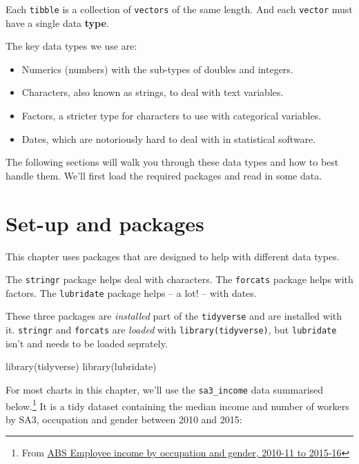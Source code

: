 \documentclass[
]{book}
\newenvironment{Shaded}{\begin{snugshade}}{\end{snugshade}}
\newcommand{\FunctionTok}[1]{\textcolor[rgb]{0.00,0.00,0.00}{#1}}
\newcommand{\NormalTok}[1]{#1}
\providecommand{\tightlist}{%
  \setlength{\itemsep}{0pt}\setlength{\parskip}{0pt}}
\begin{document}
Each \texttt{tibble} is a collection of \texttt{vectors} of the same length. And each \texttt{vector} must have a single data \textbf{type}.

The key data types we use are:

\begin{itemize}
\tightlist
\item
  Numerics (numbers) with the sub-types of doubles and integers.
\item
  Characters, also known as strings, to deal with text variables.
\item
  Factors, a stricter type for characters to use with categorical variables.
\item
  Dates, which are notoriously hard to deal with in statistical software.
\end{itemize}

The following sections will walk you through these data types and how to best handle them. We'll first load the required packages and read in some data.

\hypertarget{set-up-and-packages}{%
\section{Set-up and packages}\label{set-up-and-packages}}

This chapter uses packages that are designed to help with different data types.

The \texttt{stringr} package helps deal with characters. The \texttt{forcats} package helps with factors. The \texttt{lubridate} package helps -- a lot! -- with dates.

These three packages are \emph{installed} part of the \texttt{tidyverse} and are installed with it. \texttt{stringr} and \texttt{forcats} are \emph{loaded} with \texttt{library(tidyverse)}, but \texttt{lubridate} isn't and needs to be loaded seprately.

\begin{Shaded}
\begin{Highlighting}[]
\FunctionTok{library}\NormalTok{(tidyverse)}
\FunctionTok{library}\NormalTok{(lubridate)}
\end{Highlighting}
\end{Shaded}

For most charts in this chapter, we'll use the \texttt{sa3\_income} data summarised below.\footnote{From \href{https://www.abs.gov.au/AUSSTATS/abs@.nsf/DetailsPage/6524.0.55.0022011-2016?OpenDocument}{ABS Employee income by occupation and gender, 2010-11 to 2015-16}} It is a tidy dataset containing the median income and number of workers by SA3, occupation and gender between 2010 and 2015:
\end{document}
